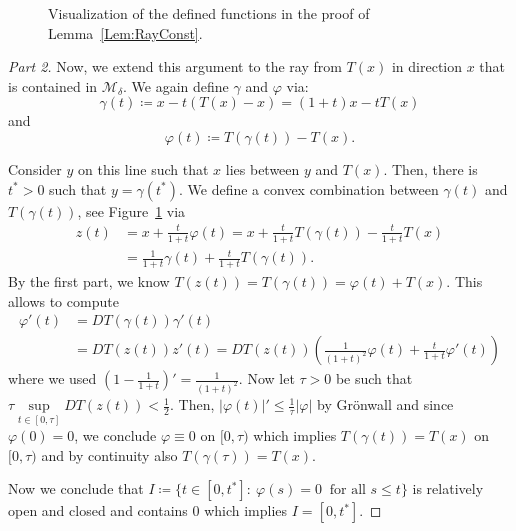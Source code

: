 \documentclass[11pt]{amsart}%
\theoremstyle{plain}
\newcommand{\1}{\mathbf{1}}
\newcommand{\M}{\mathcal{M}}
\begin{document}
\begin{figure}[!ht]
    \centering
    \caption{Visualization of the defined functions in the proof of Lemma~\ref{Lem:RayConst}.}
    \label{Fig:VisConstRay}
\end{figure}

\begin{proof}[Part 2]
    Now, we extend this argument to the ray from $T(x)$ in direction $x$ that is contained in $\M_\delta$. We again define $\gamma$ and $\varphi$ via:
    $$\gamma(t)\coloneqq x-t(T(x)-x)=(1+t)x-tT(x)$$
    and 
    $$\varphi(t)\coloneqq T(\gamma(t))-T(x).$$
    
    Consider $y$ on this line such that $x$ lies between $y$ and $T(x)$. Then, there is $t^*>0$ such that $y=\gamma(t^*)$. We define a convex combination between $\gamma(t)$ and $T(\gamma(t))$, see Figure~\ref{Fig:VisConstRay} via
    \begin{align*}
        z(t)&=x+\frac{t}{1+t}\varphi(t)=x+\frac{t}{1+t}T(\gamma(t))-\frac{t}{1+t}T(x)\\
        &=\frac{1}{1+t}\gamma(t)+\frac{t}{1+t}T(\gamma(t)).
    \end{align*}
    By the first part, we know $T(z(t))=T(\gamma(t))=\varphi(t)+T(x)$.
    This allows to compute
    \begin{align*}
        \varphi'(t)&=DT(\gamma(t))\gamma'(t)\\
        &=DT(z(t))z'(t)=DT(z(t))\left(\frac{1}{(1+t)^2}\varphi(t)+\frac{t}{1+t}\varphi'(t)\right)
    \end{align*}
    where we used $\left(1-\frac{1}{1+t}\right)'=\frac{1}{(1+t)^2}$.
    Now let $\tau>0$ be such that $\tau\sup\limits_{t\in [0,\tau]}DT(z(t))<\frac{1}{2}$.
    Then, $|\varphi(t)|'\leq \frac{1}{\tau}|\varphi|$ by Grönwall and since $\varphi(0)=0$, we conclude $\varphi\equiv 0$ on $[0,\tau)$ which implies $T(\gamma(t))=T(x)$ on $[0,\tau)$ and by continuity also $T(\gamma(\tau))=T(x)$.

    Now we conclude that $I\coloneqq \{t\in [0,t^*]:\ \varphi(s)=0 \ \text{ for all } s\leq t\}$ is relatively open and closed and contains $0$ which implies $I=[0,t^*]$.
\end{proof}
\end{document}
